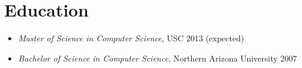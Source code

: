 \documentclass[11pt]{article}
\begin{document}
\section*{Education}
\label{sec-4}

\begin{itemize}
\item \emph{Master of Science in Computer Science}, USC 2013 (expected)
\item \emph{Bachelor of Science in Computer Science}, Northern Arizona University 2007
\end{itemize}
\end{document}
